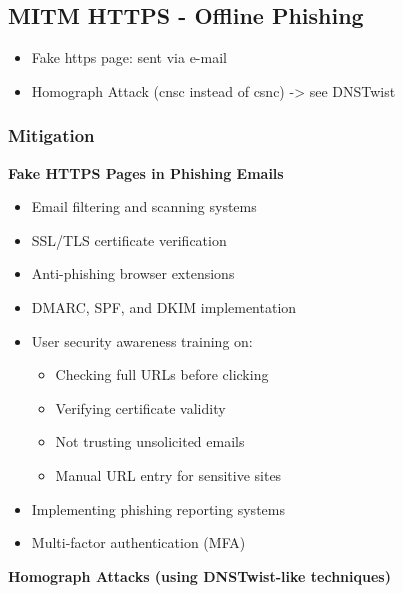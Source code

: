 \subsection{MITM HTTPS - Offline Phishing}
\begin{itemize}
    \item Fake https page: sent via e-mail
    \item Homograph Attack (cnsc instead of csnc) -> see DNSTwist
\end{itemize}

\subsubsection*{Mitigation}
\textbf{Fake HTTPS Pages in Phishing Emails}
\begin{itemize}
\item Email filtering and scanning systems
\item SSL/TLS certificate verification
\item Anti-phishing browser extensions
\item DMARC, SPF, and DKIM implementation
\item User security awareness training on:
\begin{itemize}
\item Checking full URLs before clicking
\item Verifying certificate validity
\item Not trusting unsolicited emails
\item Manual URL entry for sensitive sites
\end{itemize}
\item Implementing phishing reporting systems
\item Multi-factor authentication (MFA)
\end{itemize}
\textbf{Homograph Attacks (using DNSTwist-like techniques)}
